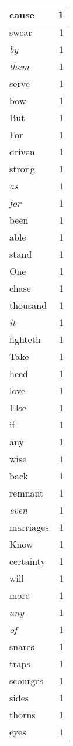 \begin{center}
\begin{longtable}{l|r}
cause & 1\\ \hline 
swear & 1\\ \hline 
\emph{by} & 1\\ \hline 
\emph{them} & 1\\ \hline 
serve & 1\\ \hline 
bow & 1\\ \hline 
But & 1\\ \hline 
For & 1\\ \hline 
driven & 1\\ \hline 
strong & 1\\ \hline 
\emph{as} & 1\\ \hline 
\emph{for} & 1\\ \hline 
been & 1\\ \hline 
able & 1\\ \hline 
stand & 1\\ \hline 
One & 1\\ \hline 
chase & 1\\ \hline 
thousand & 1\\ \hline 
\emph{it} & 1\\ \hline 
fighteth & 1\\ \hline 
Take & 1\\ \hline 
heed & 1\\ \hline 
love & 1\\ \hline 
Else & 1\\ \hline 
if & 1\\ \hline 
any & 1\\ \hline 
wise & 1\\ \hline 
back & 1\\ \hline 
remnant & 1\\ \hline 
\emph{even} & 1\\ \hline 
marriages & 1\\ \hline 
Know & 1\\ \hline 
certainty & 1\\ \hline 
will & 1\\ \hline 
more & 1\\ \hline 
\emph{any} & 1\\ \hline 
\emph{of} & 1\\ \hline 
snares & 1\\ \hline 
traps & 1\\ \hline 
scourges & 1\\ \hline 
sides & 1\\ \hline 
thorns & 1\\ \hline 
eyes & 1\\ \hline 

\end{longtable}
\end{center}

